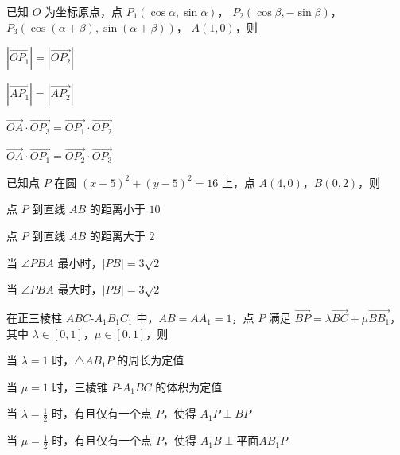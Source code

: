 \documentclass{exam-zh}
\begin{document}
\begin{question}
  已知 $O$ 为坐标原点，点
  $P_1(\cos\alpha,  \sin\alpha)$，
  $P_2(\cos\beta , -\sin\beta)$，
  $P_3(\cos(\alpha + \beta),  \sin(\alpha + \beta))$，
  $A(1, 0)$，则 \paren
  \begin{choices}
    \item $|\overrightarrow{OP_1}| = |\overrightarrow{OP_2}|$
    \item $|\overrightarrow{AP_1}| = |\overrightarrow{AP_2}|$
    \item $\overrightarrow{OA} \cdot \overrightarrow{OP_3}
      = \overrightarrow{OP_1} \cdot \overrightarrow{OP_2}$
    \item $\overrightarrow{OA} \cdot \overrightarrow{OP_1}
      = \overrightarrow{OP_2} \cdot \overrightarrow{OP_3}$
  \end{choices}
\end{question}

\begin{question}
  已知点 $P$ 在圆 $(x - 5)^2 + (y - 5)^2 = 16$ 上，点 $A(4, 0)$，$B(0, 2)$，则 \paren
  \begin{choices}
    \item 点 $P$ 到直线 $AB$ 的距离小于 $10$
    \item 点 $P$ 到直线 $AB$ 的距离大于 $2$
    \item 当 $\angle PBA$ 最小时，$|PB| = 3 \sqrt{2}$
    \item 当 $\angle PBA$ 最大时，$|PB| = 3 \sqrt{2}$
  \end{choices}
\end{question}

\begin{question}
  在正三棱柱 $ABC$-$A_1 B_1 C_1$ 中，$AB = A A_1 = 1$，点 $P$ 满足
  $\overrightarrow{BP} = \lambda \overrightarrow{BC} + \mu \overrightarrow{BB_1}$，
  其中 $\lambda \in [0, 1]$，$\mu \in [0, 1]$，则 \paren
  \begin{choices}
    \item 当 $\lambda = 1$ 时，$\triangle A B_1 P$ 的周长为定值
    \item 当 $\mu = 1$ 时，三棱锥 $P$-$A_1 B C$ 的体积为定值
    \item 当 $\lambda = \frac{1}{2}$ 时，有且仅有一个点 $P$，使得 $A_1 P \perp BP$
    \item 当 $\mu = \frac{1}{2}$ 时，有且仅有一个点 $P$，使得 $A_1 B \perp \text{平面} A B_1 P$
  \end{choices}
\end{question}
\end{document}
